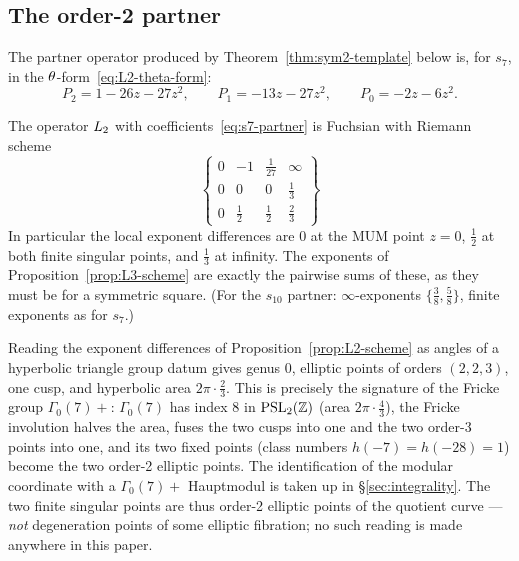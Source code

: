\subsection{The order-2 partner}

The partner operator produced by Theorem~\ref{thm:sym2-template} below is,
for $s_7$, in the $\theta$-form~\eqref{eq:L2-theta-form}:
\begin{equation}\label{eq:s7-partner}
  P_2 = 1 - 26z - 27z^2, \qquad
  P_1 = -13z - 27z^2, \qquad
  P_0 = -2z - 6z^2.
\end{equation}

\begin{proposition}
\label{prop:L2-scheme}
The operator $L_2$ with coefficients~\eqref{eq:s7-partner} is Fuchsian with
Riemann scheme
\[
\begin{Bmatrix}
  0 & -1 & \tfrac1{27} & \infty \\
  \hline
  0 & 0 & 0 & \tfrac13 \\
  0 & \tfrac12 & \tfrac12 & \tfrac23
\end{Bmatrix}
\]
In particular the local exponent differences are $0$ at the MUM point $z=0$,
$\tfrac12$ at both finite singular points, and $\tfrac13$ at infinity. The
exponents of Proposition~\ref{prop:L3-scheme} are exactly the pairwise sums
of these, as they must be for a symmetric square. (For the $s_{10}$ partner:
$\infty$-exponents $\{\tfrac38, \tfrac58\}$, finite exponents as for $s_7$.)
\end{proposition}

\begin{remark}\label{rem:signature}
Reading the exponent differences of Proposition~\ref{prop:L2-scheme} as
angles of a hyperbolic triangle group datum gives genus $0$, elliptic points
of orders $(2,2,3)$, one cusp, and hyperbolic area $2\pi\cdot\tfrac23$. This
is precisely the signature of the Fricke group $\Gamma_0(7)+$: $\Gamma_0(7)$
has index $8$ in $\mathrm{PSL}_2(\mathbb{Z})$ (area $2\pi\cdot\tfrac43$), the Fricke
involution halves the area, fuses the two cusps into one and the two order-3
points into one, and its two fixed points (class numbers
$h(-7)=h(-28)=1$) become the two order-2 elliptic points. The identification
of the modular coordinate with a $\Gamma_0(7)+$ Hauptmodul is taken up in
\S\ref{sec:integrality}. The two finite singular points are thus order-2
elliptic points of the quotient curve --- \emph{not} degeneration points of
some elliptic fibration; no such reading is made anywhere in this paper.
\end{remark}

